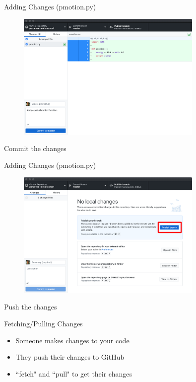 \documentclass{beamer}
\begin{document}
    \begin{frame}{Adding Changes (pmotion.py)}
        \begin{figure}
            \centering
            \includegraphics[width=0.8\textwidth]{figures/add_5.png}
        \end{figure}

        \centering
        Commit the changes
    \end{frame}

    \begin{frame}{Adding Changes (pmotion.py)}
        \begin{figure}
            \centering
            \includegraphics[width=0.8\textwidth]{figures/add_3.png}
        \end{figure}

        \centering
        Push the changes
    \end{frame}

    \begin{frame}{Fetching/Pulling Changes}
            \begin{itemize}
                \item Someone makes changes to your code
                \item They push their changes to GitHub
                \item ``fetch" and ``pull" to get their changes
            \end{itemize}
    \end{frame}
\end{document}
